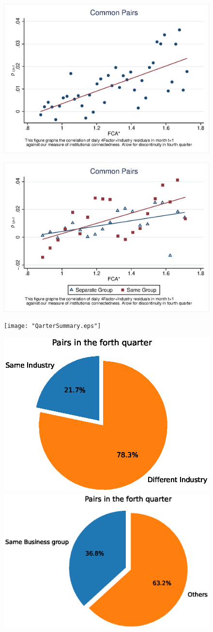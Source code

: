 \documentclass[12pt, a4paper]{article}
\begin{document}
 \begin{figure}[htbp]
	\centering  
	\includegraphics[width=0.6\linewidth]{"Qmcorr5subsample.eps"}
\end{figure}

 \begin{figure}[htbp]
	\centering  
	\includegraphics[width=0.6\linewidth]{"Qmcorr5lrdbgsubsample.eps"}
\end{figure}


 \begin{figure}[htbp]
	\centering  
	\texttt{[image: "QarterSummary.eps"]}
\end{figure}

	\begin{figure}   
	\centering
	\includegraphics[width=0.45\linewidth]{"sameIndustryinQuarter.eps"}
	\includegraphics[width=0.45\linewidth]{"sameIBGinQuarter.eps"}
\end{figure}
\FloatBarrier
\end{document}
